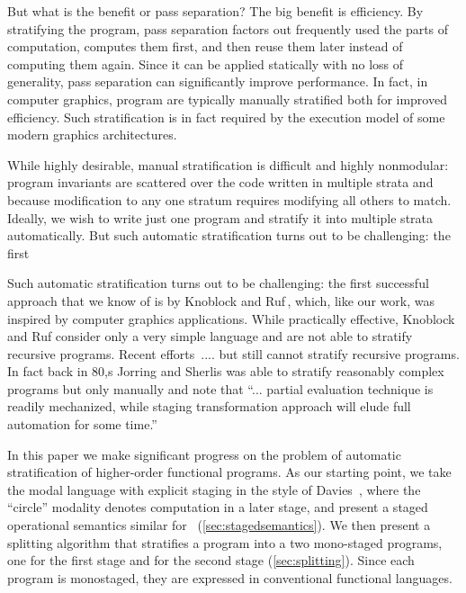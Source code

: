 

But what is the benefit or pass separation? The big benefit is
efficiency. By stratifying the program, pass separation factors out
frequently used the parts of computation, computes them first, and
then reuse them later instead of computing them again.  Since it can
be applied statically with no loss of generality, pass separation can
significantly improve performance.  In fact, in computer graphics,
program are typically manually stratified both for improved
efficiency. Such stratification is in fact required by the execution
model of some modern graphics architectures.  

While highly desirable, manual stratification is difficult and highly
nonmodular: program invariants are scattered over the code written in
multiple strata and because modification to any one stratum requires
modifying all others to match.  Ideally, we wish to write just one
program and stratify it into multiple strata automatically.  But such
automatic stratification turns out to be challenging: the first

Such automatic stratification turns out to be challenging: the first
successful approach that we know of is by Knoblock and
Ruf\,\cite{knoblock96}, which, like our work, was inspired by computer
graphics applications.  While practically effective, Knoblock and Ruf
consider only a very simple language and are not able to stratify
recursive programs.  Recent
efforts\,\cite{Proudfoot:2001,Foley:2011,He:2014} ....  but still
cannot stratify recursive programs.
%
In fact back in 80,s Jorring and Sherlis was able to stratify
reasonably complex programs but only manually and note that
``... partial evaluation technique is readily mechanized, while
staging transformation approach will elude full automation for some
time.''

In this paper we make significant progress on the problem of automatic
stratification of higher-order functional programs.  As our starting
point, we take the modal language \langname with explicit staging in
the style of Davies~\cite{davies96}, where the ``circle'' modality
denotes computation in a later stage, and present a staged operational
semantics similar for \lang\ (\ref{sec:stagedsemantics}).  We then
present a splitting algorithm that stratifies a \langname program into
a two mono-staged programs, one for the first stage and for the second
stage (\ref{sec:splitting}).  Since each program is monostaged, they
are expressed in conventional functional languages.

